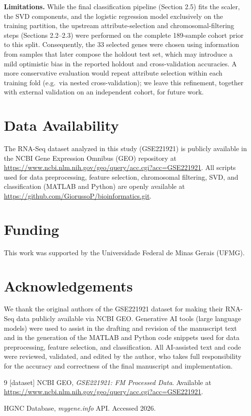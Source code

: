 \documentclass[twocolumn]{article}
\begin{document}
\textbf{Limitations.} While the final classification pipeline (Section 2.5) fits the scaler, the SVD components, and the logistic regression model exclusively on the training partition, the upstream attribute-selection and chromosomal-filtering steps (Sections 2.2--2.3) were performed on the complete 189-sample cohort prior to this split. Consequently, the 33 selected genes were chosen using information from samples that later compose the holdout test set, which may introduce a mild optimistic bias in the reported holdout and cross-validation accuracies. A more conservative evaluation would repeat attribute selection within each training fold (e.g.\ via nested cross-validation); we leave this refinement, together with external validation on an independent cohort, for future work.

\section*{Data Availability}
The RNA-Seq dataset analyzed in this study (GSE221921) is publicly available in the NCBI Gene Expression Omnibus (GEO) repository at \url{https://www.ncbi.nlm.nih.gov/geo/query/acc.cgi?acc=GSE221921}. All scripts used for data preprocessing, feature selection, chromosomal filtering, SVD, and classification (MATLAB and Python) are openly available at \url{https://github.com/GiorussoP/bioinformatics.git}.

\vspace{-1em}
\section*{Funding}
This work was supported by the Universidade Federal de Minas Gerais (UFMG).

\section*{Acknowledgements}
We thank the original authors of the GSE221921 dataset for making their RNA-Seq data publicly available via NCBI GEO. Generative AI tools (large language models) were used to assist in the drafting and revision of the manuscript text and in the generation of the MATLAB and Python code snippets used for data preprocessing, feature selection, and classification. All AI-assisted text and code were reviewed, validated, and edited by the author, who takes full responsibility for the accuracy and correctness of the final manuscript and implementation.

\begin{thebibliography}{9}
[dataset] NCBI GEO, \textit{GSE221921: FM Processed Data}. Available at \url{https://www.ncbi.nlm.nih.gov/geo/query/acc.cgi?acc=GSE221921}.

HGNC Database, \textit{mygene.info} API. Accessed 2026.
\end{thebibliography}
\end{document}
